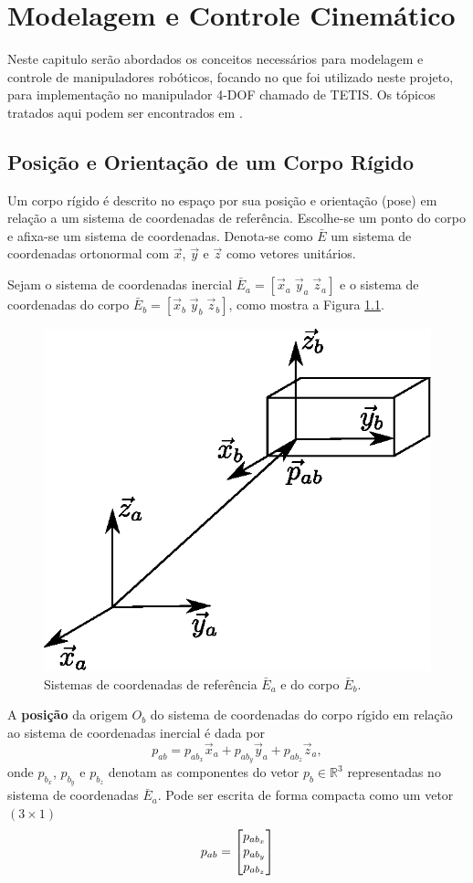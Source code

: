 \chapter{Modelagem e Controle Cinemático}
Neste capitulo serão abordados os conceitos necessários para modelagem e controle de manipuladores robóticos, focando no que foi utilizado neste projeto, para implementação no manipulador 4-DOF chamado de TETIS. Os tópicos tratados aqui podem ser encontrados em \citep{siciliano, petercorke}.

\section{Posição e Orientação de um Corpo Rígido}

Um corpo rígido é descrito no espaço por sua posição e orientação (pose) em relação a um sistema de coordenadas de referência. Escolhe-se um ponto do corpo e afixa-se um sistema de coordenadas. Denota-se como $\bar{E}$ um sistema de coordenadas ortonormal com $\vec{x}$, $\vec{y}$ e $\vec{z}$ como vetores unitários.

Sejam o sistema de coordenadas inercial $\bar{E}_a = [\vec{x}_a \; \vec{y}_a \; \vec{z}_a ]$ e o sistema de coordenadas do corpo $\bar{E}_b = [\vec{x}_b \; \vec{y}_b \; \vec{z}_b ]$, como mostra a Figura \ref{fig:pose_frames}.

\begin{figure}[!h]
  \centering
  \includegraphics[width=0.4\linewidth]{./img/pose_frames}
  \caption{Sistemas de coordenadas de referência $\bar{E}_a$ e do corpo $\bar{E}_b$.}
  \label{fig:pose_frames}
\end{figure}

A \textbf{posição} da origem $O_b$ do sistema de coordenadas do corpo rígido em relação ao sistema de coordenadas inercial é dada por 
\begin{equation}
p_{ab} = p_{ab_x} \vec{x}_a + p_{ab_y} \vec{y}_a + p_{ab_z} \vec{z}_a, 
\end{equation}
onde $p_{b_x}$, $p_{b_y}$ e $p_{b_z}$ denotam as componentes do vetor $p_b \in \mathbb{R}^3$ representadas no sistema de coordenadas $\bar{E}_a$. Pode ser escrita de forma compacta como um vetor $(3 \times 1)$
\begin{equation}
p_{ab} = \begin{bmatrix}p_{ab_x} \\ p_{ab_y} \\ p_{ab_z}\end{bmatrix}
\end{equation}

